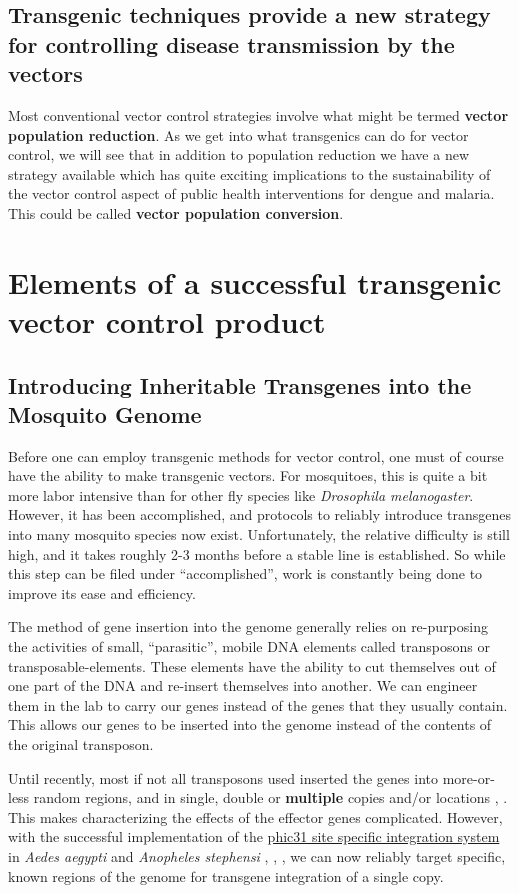 \subsection{Transgenic techniques provide a new strategy for controlling disease transmission by the vectors}

Most conventional vector control strategies involve what might be termed \textbf{vector population reduction}.
As we get into what transgenics can do for vector control, we will see that in addition to population reduction we have a new strategy available which has quite exciting implications to the sustainability of the vector control aspect of public health interventions for dengue and malaria.
This could be called \textbf{vector population conversion}.

\section{Elements of a successful transgenic vector control product}
\dummytext

\subsection{Introducing Inheritable Transgenes into the Mosquito Genome}

Before one can employ transgenic methods for vector control, one must of course have the ability to make transgenic vectors.
For mosquitoes, this is quite a bit more labor intensive than for other fly species like \emph{Drosophila melanogaster}.
However, it has been accomplished, and protocols to reliably introduce transgenes into many mosquito species now exist.
Unfortunately, the relative difficulty is still high, and it takes roughly 2-3 months before a stable line is established.
So while this step can be filed under ``accomplished'', work is constantly being done to improve its ease and efficiency.

The method of gene insertion into the genome generally relies on re-purposing the activities of small, ``parasitic'', mobile DNA elements called \glspl{transposon} or \glspl{transposable-element}.
These elements have the ability to cut themselves out of one part of the DNA and re-insert themselves into another.
We can engineer them in the lab to carry our genes instead of the genes that they usually contain.
This allows our genes to be inserted into the genome instead of the contents of the original transposon.

Until recently, most if not all transposons used inserted the genes into more-or-less random regions, and in single, double or \textbf{multiple} copies and/or locations \cite{Adelman2004}, \cite{Sethuraman2007}.
This makes characterizing the effects of the effector genes complicated.
However, with the successful implementation of the \href{http://en.wikipedia.org/wiki/Site-specific\_recombinase\_technology\#PhiC31\_Integrase}{phic31 site specific integration system} in \emph{Aedes aegypti} and \emph{Anopheles stephensi} \cite{Thorpe1998}, \cite{Nimmo2006}, \cite{Isaacs2012}, we can now reliably target specific, known regions of the genome for transgene integration of a single copy.

